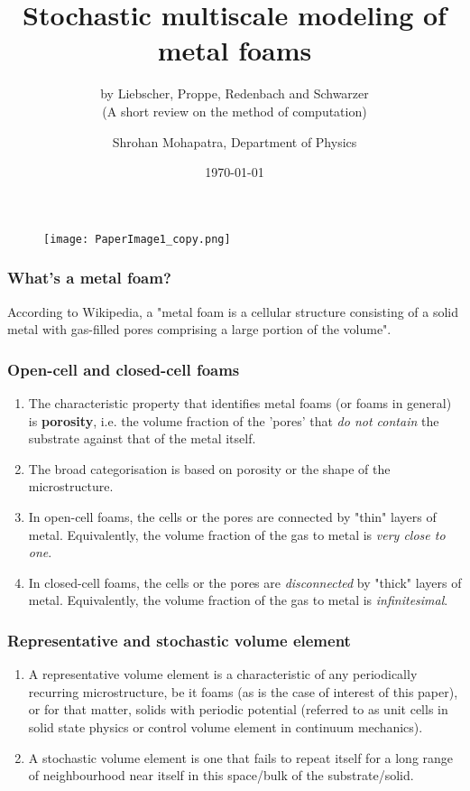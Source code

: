 \documentclass{beamer}
\title{Stochastic multiscale modeling of metal foams}
\subtitle{by Liebscher, Proppe, Redenbach and Schwarzer
\\(A short review on the method of computation)}
\author{Shrohan Mohapatra, Department of Physics}
\institute{University of Massachusetts, Amherst}
\date{\today}
\begin{document}
\begin{frame}
\titlepage
\end{frame}
\begin{frame}
\begin{figure}
\texttt{[image: PaperImage1\_copy.png]}
\end{figure}
\end{frame}
\begin{frame}
\frametitle{What's a metal foam?}
According to Wikipedia, a "metal foam is a cellular structure consisting of a solid metal with gas-filled pores comprising a large portion of the volume".
\end{frame}
\begin{frame}
\frametitle{Open-cell and closed-cell foams}
\begin{enumerate}
	\item The characteristic property that identifies metal foams (or foams in general) is \textbf{porosity}, i.e. the volume fraction of the 'pores' that \textit{do not contain} the substrate against that of the metal itself.
	\item The broad categorisation is based on porosity or the shape of the microstructure.
	\item In open-cell foams, the cells or the pores are connected by "thin" layers of metal. Equivalently, the volume fraction of the gas to metal is \textit{very close to one}.
	\item In closed-cell foams, the cells or the pores are \textit{disconnected} by "thick" layers of metal. Equivalently, the volume fraction of the gas to metal is \textit{infinitesimal}.
\end{enumerate}
\end{frame}

\begin{frame}
\frametitle{Representative and stochastic volume element}
\begin{enumerate}
	\item A representative volume element is a characteristic of any periodically recurring microstructure, be it foams (as is the case of interest of this paper), or for that matter, solids with periodic potential (referred to as unit cells in solid state physics or control volume element in continuum mechanics).
	\item A stochastic volume element is one that fails to repeat itself for a long range of neighbourhood near itself in this space/bulk of the substrate/solid.
\end{enumerate}
\end{frame}
\end{document}
